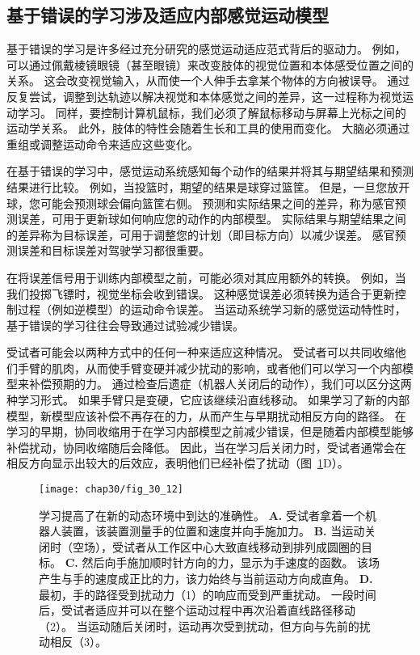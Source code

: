 \subsection{基于错误的学习涉及适应内部感觉运动模型}

基于错误的学习是许多经过充分研究的感觉运动适应范式背后的驱动力。
例如，可以通过佩戴棱镜眼镜（甚至眼镜）来改变肢体的视觉位置和本体感受位置之间的关系。
这会改变视觉输入，从而使一个人伸手去拿某个物体的方向被误导。
通过反复尝试，调整到达轨迹以解决视觉和本体感觉之间的差异，这一过程称为视觉运动学习。
同样，要控制计算机鼠标，我们必须了解鼠标移动与屏幕上光标之间的运动学关系。
此外，肢体的特性会随着生长和工具的使用而变化。
大脑必须通过重组或调整运动命令来适应这些变化。


在基于错误的学习中，感觉运动系统感知每个动作的结果并将其与期望结果和预测结果进行比较。
例如，当投篮时，期望的结果是球穿过篮筐。
但是，一旦您放开球，您可能会预测球会偏向篮筐右侧。
预测和实际结果之间的差异，称为感官预测误差，可用于更新球如何响应您的动作的内部模型。
实际结果与期望结果之间的差异称为目标误差，可用于调整您的计划（即目标方向）以减少误差。
感官预测误差和目标误差对驾驶学习都很重要。


在将误差信号用于训练内部模型之前，可能必须对其应用额外的转换。
例如，当我们投掷飞镖时，视觉坐标会收到错误。
这种感觉误差必须转换为适合于更新控制过程（例如逆模型）的运动命令误差。
当运动系统学习新的感觉运动特性时，基于错误的学习往往会导致通过试验减少错误。


受试者可能会以两种方式中的任何一种来适应这种情况。
受试者可以共同收缩他们手臂的肌肉，从而使手臂变硬并减少扰动的影响，或者他们可以学习一个内部模型来补偿预期的力。
通过检查后遗症（机器人关闭后的动作），我们可以区分这两种学习形式。
如果手臂只是变硬，它应该继续沿直线移动。
如果学习了新的内部模型，新模型应该补偿不再存在的力，从而产生与早期扰动相反方向的路径。
在学习的早期，协同收缩用于在学习内部模型之前减少错误，但是随着内部模型能够补偿扰动，协同收缩随后会降低。
因此，当在学习后关闭力时，受试者通常会在相反方向显示出较大的后效应，表明他们已经补偿了扰动（图~\ref{fig:30_12}D）。


\begin{figure}[htbp]
	\centering
	\texttt{[image: chap30/fig\_30\_12]}
	\caption{学习提高了在新的动态环境中到达的准确性\cite{brashers1996consolidation}。
		\textbf{A.} 受试者拿着一个机器人装置，该装置测量手的位置和速度并向手施加力。
		\textbf{B.} 当运动关闭时（空场），受试者从工作区中心大致直线移动到排列成圆圈的目标。
		\textbf{C.} 然后向手施加顺时针方向的力，显示为手速度的函数。
		该场产生与手的速度成正比的力，该力始终与当前运动方向成直角。
		\textbf{D.} 最初，手的路径受到扰动力（1）的响应而受到严重扰动。
		一段时间后，受试者适应并可以在整个运动过程中再次沿着直线路径移动（2）。
		当运动随后关闭时，运动再次受到扰动，但方向与先前的扰动相反（3）。}
	\label{fig:30_12}
\end{figure}


